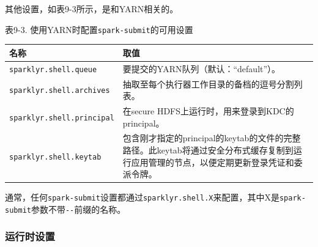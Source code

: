 \documentclass[
]{article}
\begin{document}
其他设置，如表9-3所示，是和YARN相关的。

表9-3. 使用YARN时配置\texttt{spark-submit}的可用设置

\begin{longtable}[]{@{}ll@{}}
\toprule
\begin{minipage}[b]{0.47\columnwidth}\raggedright
名称\strut
\end{minipage} & \begin{minipage}[b]{0.47\columnwidth}\raggedright
取值\strut
\end{minipage}\tabularnewline
\midrule
\endhead
\begin{minipage}[t]{0.47\columnwidth}\raggedright
\texttt{sparklyr.shell.queue}\strut
\end{minipage} & \begin{minipage}[t]{0.47\columnwidth}\raggedright
要提交的YARN队列（默认：``default''）。\strut
\end{minipage}\tabularnewline
\begin{minipage}[t]{0.47\columnwidth}\raggedright
\texttt{sparklyr.shell.archives}\strut
\end{minipage} & \begin{minipage}[t]{0.47\columnwidth}\raggedright
抽取至每个执行器工作目录的备档的逗号分割列表。\strut
\end{minipage}\tabularnewline
\begin{minipage}[t]{0.47\columnwidth}\raggedright
\texttt{sparklyr.shell.principal}\strut
\end{minipage} & \begin{minipage}[t]{0.47\columnwidth}\raggedright
在secure HDFS上运行时，用来登录到KDC的principal。\strut
\end{minipage}\tabularnewline
\begin{minipage}[t]{0.47\columnwidth}\raggedright
\texttt{sparklyr.shell.keytab}\strut
\end{minipage} & \begin{minipage}[t]{0.47\columnwidth}\raggedright
包含刚才指定的principal的keytab的文件的完整路径。此keytab将通过安全分布式缓存复制到运行应用管理的节点，以便定期更新登录凭证和委派令牌。\strut
\end{minipage}\tabularnewline
\bottomrule
\end{longtable}

通常，任何\texttt{spark-submit}设置都通过\texttt{sparklyr.shell.X}来配置，其中X是\texttt{spark-submit}参数不带\texttt{-\/-}前缀的名称。

\hypertarget{ux8fd0ux884cux65f6ux8bbeux7f6e}{%
\subsubsection{运行时设置}\label{ux8fd0ux884cux65f6ux8bbeux7f6e}}
\end{document}
